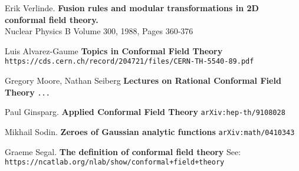 \documentclass[12pt]{article}
\begin{document}
\selectfont \fontsize{12}{10}\selectfont


\begin{thebibliography}{}

\item Erik Verlinde. \textbf{Fusion rules and modular transformations in 2D conformal field theory.} \\ Nuclear Physics B
Volume 300, 1988, Pages 360-376

\item Luis Alvarez-Gaume \textbf{Topics in Conformal Field Theory} \\ \texttt{https://cds.cern.ch/record/204721/files/CERN-TH-5540-89.pdf}

\item Gregory Moore, Nathan Seiberg \textbf{Lectures on Rational Conformal Field Theory} \texttt{...}

\item Paul Ginsparg.  \textbf{Applied Conformal Field Theory} \texttt{arXiv:hep-th/9108028}

\item Mikhail Sodin. \textbf{Zeroes of Gaussian analytic functions} \texttt{arXiv:math/0410343}

\item Graeme Segal. \textbf{The definition of conformal field theory} See: \texttt{https://ncatlab.org/nlab/show/conformal+field+theory}


\end{thebibliography}
\end{document}
